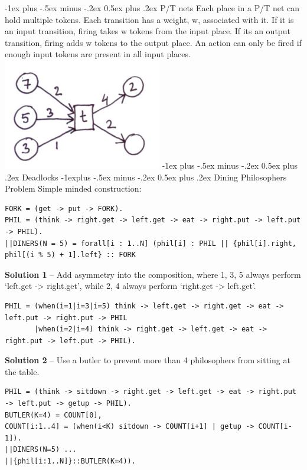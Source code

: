 \documentclass[letterpaper, 8pt]{extarticle}
\makeatletter
\renewcommand{\section}{\@startsection{section}{1}{0mm}%
                                {-1ex plus -.5ex minus -.2ex}%
                                {0.5ex plus .2ex}%
                                {\normalfont\normalsize\bfseries}}
\renewcommand{\subsection}{\@startsection{subsection}{2}{0mm}%
                                {-1explus -.5ex minus -.2ex}%
                                {0.5ex plus .2ex}%
                                {\normalfont\small\bfseries}}
\makeatother
\begin{document}
\begin{multicols*}{5}
  \section{P/T nets}
  Each place in a P/T net can hold multiple tokens. Each transition has a weight, w, associated with it. If it is an input transition, firing takes w tokens from the input place. If its an output transition, firing adds w tokens to the output place. An action can only be fired if enough input tokens are present in all input places.
  \includegraphics[width=.7\linewidth]{ptnet.png}
  \section{Deadlocks}
  \subsection{Dining Philosophers Problem}
  Simple minded construction:
  \begin{lstlisting}
FORK = (get -> put -> FORK).
PHIL = (think -> right.get -> left.get -> eat -> right.put -> left.put -> PHIL).
||DINERS(N = 5) = forall[i : 1..N] (phil[i] : PHIL || {phil[i].right, phil[(i % 5) + 1].left} :: FORK
\end{lstlisting}

  \textbf{Solution 1} -- Add asymmetry into the composition, where 1, 3, 5 always perform `left.get -> right.get',
  while 2, 4 always perform `right.get -> left.get'.
  \begin{lstlisting}
PHIL = (when(i=1|i=3|i=5) think -> left.get -> right.get -> eat -> left.put -> right.put -> PHIL
       |when(i=2|i=4) think -> right.get -> left.get -> eat -> right.put -> left.put -> PHIL).
\end{lstlisting}

  \textbf{Solution 2} -- Use a butler to prevent more than 4 philosophers from sitting at the table.
  \begin{lstlisting}
PHIL = (think -> sitdown -> right.get -> left.get -> eat -> right.put -> left.put -> getup -> PHIL).
BUTLER(K=4) = COUNT[0],
COUNT[i:1..4] = (when(i<K) sitdown -> COUNT[i+1] | getup -> COUNT[i-1]).
||DINERS(N=5) ...
||{phil[i:1..N]}::BUTLER(K=4)).
\end{lstlisting}


\end{multicols*}
\end{document}
